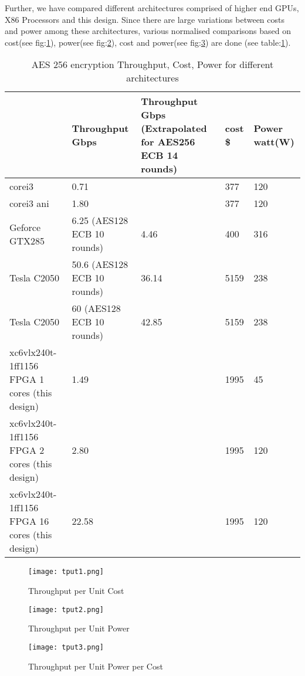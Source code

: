 \documentclass[10pt, conference, compsocconf]{IEEEtran}
\begin{document}
Further, we have compared different architectures comprised of higher end GPUs, X86 Processors and this design. Since there are large variations between costs and power among these architectures, various normalised comparisons based on cost(see fig:\ref{fig:bar0}), power(see fig:\ref{fig:bar1}), cost and power(see fig:\ref{fig:bar2}) are done (see table:\ref{tab:Throughput/cost}).

\begin{table}[!htbp]
  \caption{AES 256 encryption Throughput, Cost, Power for different architectures}
  \label{tab:Throughput/cost}
  \scriptsize

  \begin{center}
    \begin{tabular}{|p{2cm}|p{1cm}|p{1cm}|p{0.75cm}|p{0.75cm}|}
      \hline
      & Throughput Gbps & Throughput Gbps (Extrapolated for AES256 ECB 14 rounds)& cost \$ &Power watt(W)\\
      \hline
corei3        & 0.71  && 377    & 120\\
      \hline
corei3 ani    & 1.80    && 377    & 120\\
      \hline
Geforce GTX285& 6.25 (AES128 ECB 10 rounds)\cite{nishikawa2010granularity}     &4.46& 400    & 316\\
      \hline
Tesla C2050   & 50.6 (AES128 ECB 10 rounds)\cite{6131810}   &36.14& 5159   & 238\\
      \hline
Tesla C2050   & 60 (AES128 ECB 10 rounds) \cite{6332257}    &42.85& 5159   & 238\\
      \hline
xc6vlx240t-1ff1156 FPGA 1 cores (this design)     & 1.49    && 1995   & 45\\
      \hline
xc6vlx240t-1ff1156 FPGA 2 cores (this design)     & 2.80     && 1995   & 120\\
      \hline
xc6vlx240t-1ff1156 FPGA 16 cores (this design)    & 22.58    && 1995   & 120\\
      \hline
    \end{tabular}
    
  \end{center}
\end{table}

\begin{figure}[!htbp]
  \begin{center}
    \texttt{[image: tput1.png]}
    \caption{Throughput per Unit Cost}
    \label{fig:bar0}
  \end{center}
\end{figure}
\begin{figure}[!htbp]
  \begin{center}
    \texttt{[image: tput2.png]}
    \caption{Throughput per Unit Power}
    \label{fig:bar1}
  \end{center}
\end{figure}
\begin{figure}[!htbp]
  \begin{center}
    \texttt{[image: tput3.png]}
    \caption{Throughput per Unit Power per Cost}
    \label{fig:bar2}
  \end{center}
\end{figure}
\end{document}
